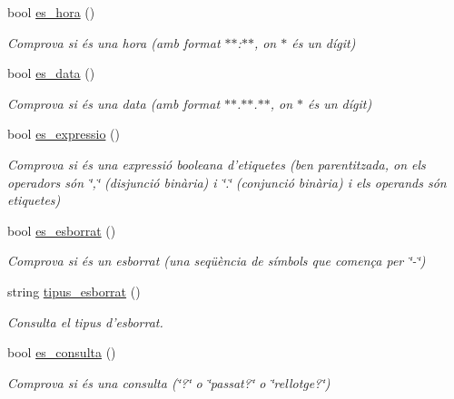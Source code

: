 \begin{DoxyCompactItemize}
bool \hyperlink{class_token_a16aead065c986f34b51c6193bd42882c}{es\-\_\-hora} ()
\begin{DoxyCompactList}\small\item\em Comprova si és una hora (amb format $\ast$$\ast$\-:$\ast$$\ast$, on $\ast$ és un dígit) \end{DoxyCompactList}\item 
bool \hyperlink{class_token_a8791d9d6123190213f63ad1026ca05be}{es\-\_\-data} ()
\begin{DoxyCompactList}\small\item\em Comprova si és una data (amb format $\ast$$\ast$.$\ast$$\ast$.$\ast$$\ast$, on $\ast$ és un dígit) \end{DoxyCompactList}\item 
bool \hyperlink{class_token_a09eb1782d5b5d9d4a2a92f33c950bfc1}{es\-\_\-expressio} ()
\begin{DoxyCompactList}\small\item\em Comprova si és una expressió booleana d'etiquetes (ben parentitzada, on els operadors són \char`\"{},\char`\"{} (disjunció binària) i \char`\"{}.\char`\"{} (conjunció binària) i els operands són etiquetes) \end{DoxyCompactList}\item 
bool \hyperlink{class_token_ab49eee0e53697bbbbbcbf0c105b3cf77}{es\-\_\-esborrat} ()
\begin{DoxyCompactList}\small\item\em Comprova si és un esborrat (una seqüència de símbols que comença per \char`\"{}-\/\char`\"{}) \end{DoxyCompactList}\item 
string \hyperlink{class_token_a12c961c772aa760b719dc3becb523ac4}{tipus\-\_\-esborrat} ()
\begin{DoxyCompactList}\small\item\em Consulta el tipus d'esborrat. \end{DoxyCompactList}\item 
bool \hyperlink{class_token_a81c4eba71c6257da6cadfab43cb237da}{es\-\_\-consulta} ()
\begin{DoxyCompactList}\small\item\em Comprova si és una consulta (\char`\"{}?\char`\"{} o \char`\"{}passat?\char`\"{} o \char`\"{}rellotge?\char`\"{}) \end{DoxyCompactList}\end{DoxyCompactItemize}
